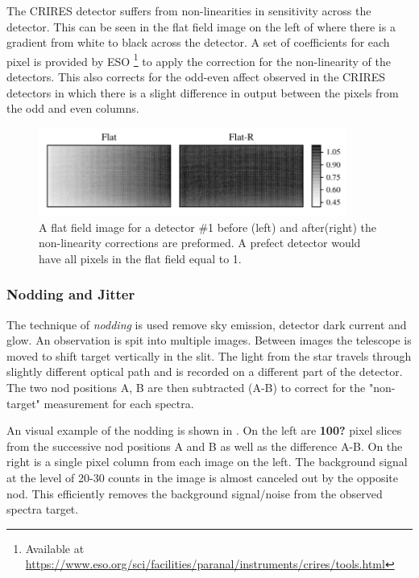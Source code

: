 The CRIRES detector suffers from non-linearities in sensitivity across the detector. This can be seen in the flat field image on the left of  where there is a gradient from white to black across the detector. A set of coefficients for each pixel is provided by ESO \footnote{Available at \href{https://www.eso.org/sci/facilities/paranal/instruments/crires/tools.html}{https://www.eso.org/sci/facilities/paranal/instruments/crires/tools.html}} to apply the correction for the non-linearity of the detectors. This also corrects for the odd-even affect observed in the CRIRES detectors in which there is a slight difference in output between the pixels from the odd and even columns. 

\begin{figure}[h]
    \centering
    \includegraphics[width=0.9\textwidth]{figures/reduction/master_flats_1.pdf}
    \caption{A flat field image for a detector \#1 before (left) and after(right) the non-linearity corrections are preformed. A prefect detector would have all pixels in the flat field equal to 1.}
    \label{fig:master_flats}
\end{figure}


\subsubsection{Nodding and Jitter}
The technique of \emph{nodding} is used remove sky emission, detector dark current and glow. An observation is spit into multiple images. Between images the telescope is moved to shift target vertically in the slit. The light from the star travels through slightly different optical path and is recorded on a different part of the detector. The two nod positions A, B are then subtracted (A-B) to correct for the "non-target" measurement for each spectra.

An visual example of the nodding is shown in . On the left are \textbf{100?} pixel slices from the successive nod positions A and B as well as the difference A-B. On the right is a single pixel column from each image on the left. The background signal at the level of 20-30 counts in the image is almost canceled out by the opposite nod. This efficiently removes the background signal/noise from the observed spectra target. 

